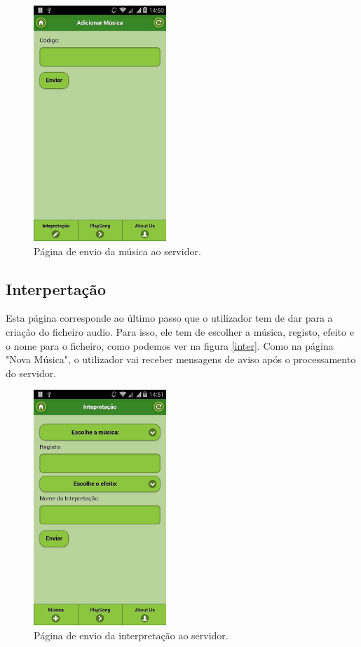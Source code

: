 \begin{figure}[htp]
\centering
\includegraphics[width=50mm]{images/appAddNote.png}
\caption{Página de envio da música ao servidor.}
\label{music}
\end{figure}

\subsection{Interpertação}
Esta página corresponde ao último passo que o utilizador tem de dar para a criação do ficheiro audio. Para isso, ele tem de escolher a música, registo, efeito e o nome para o ficheiro, como podemos ver na figura \autoref{inter}. Como na página "Nova Música", o utilizador vai receber mensagens de aviso após o processamento do servidor.

\begin{figure}[htp]
\centering
\includegraphics[width=50mm]{images/appAddMusic.png}
\caption{Página de envio da interpretação ao servidor.}
\label{inter}
\end{figure}

